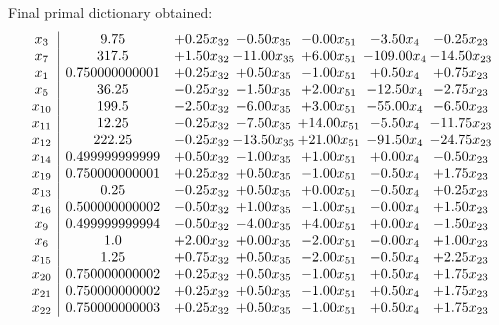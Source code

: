 \documentclass[8pt]{article}
\begin{document}
 Final primal dictionary obtained: 
\[\begin{array}{c| c c@{\hskip 2pt} c@{\hskip 2pt} c@{\hskip 2pt} c@{\hskip 2pt} c@{\hskip 2pt} }
 x_{3}   &  9.75 & +  0.25 x_{32} & -0.50 x_{35} & -0.00 x_{51} & -3.50 x_{4} & -0.25 x_{23}\\
 x_{7}   &  317.5 & +  1.50 x_{32} & -11.00 x_{35} & +  6.00 x_{51} & -109.00 x_{4} & -14.50 x_{23}\\
 x_{1}   &  0.750000000001 & +  0.25 x_{32} & +  0.50 x_{35} & -1.00 x_{51} & +  0.50 x_{4} & +  0.75 x_{23}\\
 x_{5}   &  36.25 & -0.25 x_{32} & -1.50 x_{35} & +  2.00 x_{51} & -12.50 x_{4} & -2.75 x_{23}\\
 x_{10}   &  199.5 & -2.50 x_{32} & -6.00 x_{35} & +  3.00 x_{51} & -55.00 x_{4} & -6.50 x_{23}\\
 x_{11}   &  12.25 & -0.25 x_{32} & -7.50 x_{35} & + 14.00 x_{51} & -5.50 x_{4} & -11.75 x_{23}\\
 x_{12}   &  222.25 & -0.25 x_{32} & -13.50 x_{35} & + 21.00 x_{51} & -91.50 x_{4} & -24.75 x_{23}\\
 x_{14}   &  0.499999999999 & +  0.50 x_{32} & -1.00 x_{35} & +  1.00 x_{51} & +  0.00 x_{4} & -0.50 x_{23}\\
 x_{19}   &  0.750000000001 & +  0.25 x_{32} & +  0.50 x_{35} & -1.00 x_{51} & -0.50 x_{4} & +  1.75 x_{23}\\
 x_{13}   &  0.25 & -0.25 x_{32} & +  0.50 x_{35} & +  0.00 x_{51} & -0.50 x_{4} & +  0.25 x_{23}\\
 x_{16}   &  0.500000000002 & -0.50 x_{32} & +  1.00 x_{35} & -1.00 x_{51} & -0.00 x_{4} & +  1.50 x_{23}\\
 x_{9}   &  0.499999999994 & -0.50 x_{32} & -4.00 x_{35} & +  4.00 x_{51} & +  0.00 x_{4} & -1.50 x_{23}\\
 x_{6}   &  1.0 & +  2.00 x_{32} & +  0.00 x_{35} & -2.00 x_{51} & -0.00 x_{4} & +  1.00 x_{23}\\
 x_{15}   &  1.25 & +  0.75 x_{32} & +  0.50 x_{35} & -2.00 x_{51} & -0.50 x_{4} & +  2.25 x_{23}\\
 x_{20}   &  0.750000000002 & +  0.25 x_{32} & +  0.50 x_{35} & -1.00 x_{51} & +  0.50 x_{4} & +  1.75 x_{23}\\
 x_{21}   &  0.750000000002 & +  0.25 x_{32} & +  0.50 x_{35} & -1.00 x_{51} & +  0.50 x_{4} & +  1.75 x_{23}\\
 x_{22}   &  0.750000000003 & +  0.25 x_{32} & +  0.50 x_{35} & -1.00 x_{51} & +  0.50 x_{4} & +  1.75 x_{23}\\

\end{array}\]
\end{document}

